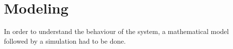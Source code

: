 \chapter{Modeling}\label{ch:modeling}

In order to understand the behaviour of the system, a mathematical model followed by a simulation had to be done. 





